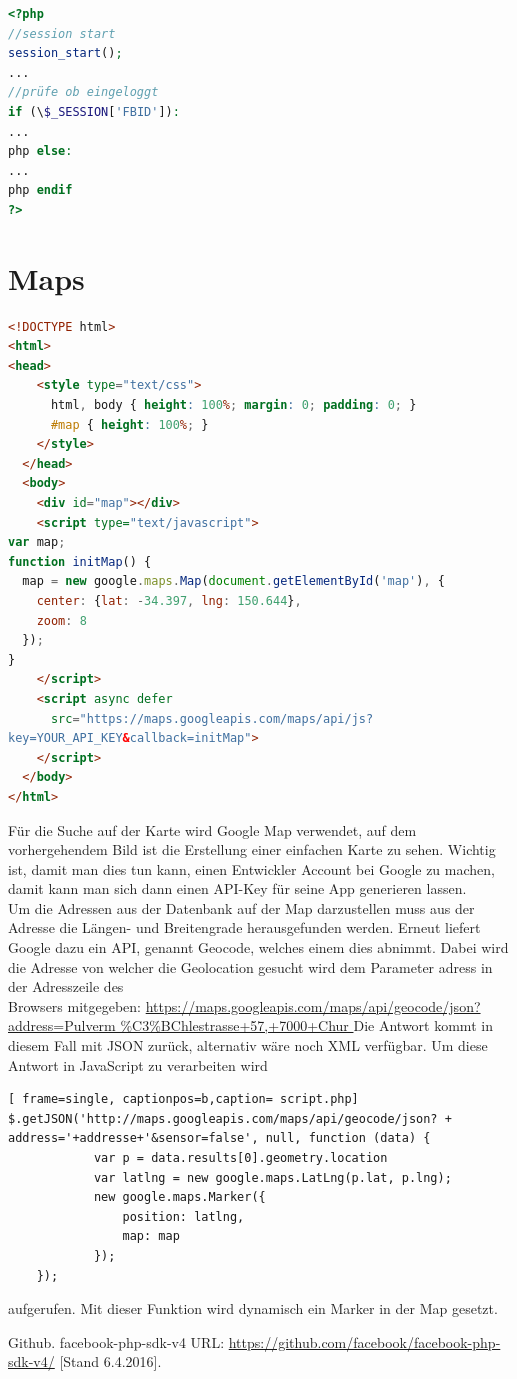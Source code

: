 \documentclass[11pt,a4paper]{scrreprt}
\begin{document}
\begin{lstlisting}[language=PHP, frame=single, captionpos=b,caption= search\_list.php]
<?php
//session start
session_start(); 
...
//prüfe ob eingeloggt
if (\$_SESSION['FBID']):
...
php else: 
...
php endif 
?> 
\end{lstlisting}




\newpage
\section{Maps}
\begin{lstlisting}[language=HTML, frame=single, captionpos=b]
<!DOCTYPE html>
<html>
<head>
    <style type="text/css">
      html, body { height: 100%; margin: 0; padding: 0; }
      #map { height: 100%; }
    </style>
  </head>
  <body>
    <div id="map"></div>
    <script type="text/javascript">
var map;
function initMap() {
  map = new google.maps.Map(document.getElementById('map'), {
    center: {lat: -34.397, lng: 150.644},
    zoom: 8
  });
}
    </script>
    <script async defer
      src="https://maps.googleapis.com/maps/api/js?
key=YOUR_API_KEY&callback=initMap">
    </script>
  </body>
</html>
\end{lstlisting}

\noindent
Für die Suche auf der Karte wird Google Map verwendet, auf dem vorhergehendem Bild ist die Erstellung einer einfachen Karte zu sehen. Wichtig ist, damit man dies tun kann, einen Entwickler Account bei Google zu machen, damit kann man sich dann einen API-Key für seine App generieren lassen.\\

\newpage
\noindent
Um die Adressen aus der Datenbank auf der Map darzustellen muss aus der Adresse die Längen- und Breitengrade herausgefunden werden. Erneut liefert Google dazu ein API, genannt Geocode, welches einem dies abnimmt. Dabei wird die Adresse von welcher die Geolocation gesucht wird dem Parameter adress in der Adresszeile des \\ 
Browsers mitgegeben: \url{ https://maps.googleapis.com/maps/api/geocode/json?address=Pulverm
Die Antwort kommt in diesem Fall mit JSON zurück, alternativ wäre noch XML verfügbar. Um diese Antwort in JavaScript zu verarbeiten wird        

\begin{lstlisting}[ frame=single, captionpos=b,caption= script.php]
$.getJSON('http://maps.googleapis.com/maps/api/geocode/json? + 
address='+addresse+'&sensor=false', null, function (data) {
            var p = data.results[0].geometry.location
            var latlng = new google.maps.LatLng(p.lat, p.lng);
            new google.maps.Marker({
                position: latlng,
                map: map
            });
    });
\end{lstlisting}
aufgerufen. Mit dieser Funktion wird dynamisch ein Marker in der Map gesetzt. 

\newpage
\begin{thebibliography}{999}

  Github. facebook-php-sdk-v4
 URL: \url{https://github.com/facebook/facebook-php-sdk-v4/} [Stand 6.4.2016].
\end{thebibliography}
\end{document}
